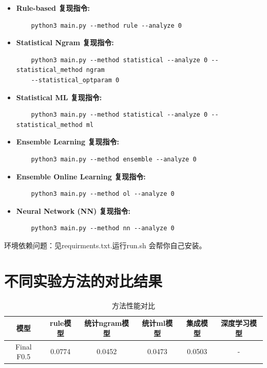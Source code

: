 \documentclass[answers]{exam}  %
\begin{document}
\begin{itemize}
    \item \textbf{Rule-based 复现指令:}
    \begin{lstlisting}
    python3 main.py --method rule --analyze 0  
    \end{lstlisting}

    \item \textbf{Statistical Ngram 复现指令:}
    \begin{lstlisting}
    python3 main.py --method statistical --analyze 0 --statistical_method ngram 
    --statistical_optparam 0
    \end{lstlisting}

    \item \textbf{Statistical ML 复现指令:}
    \begin{lstlisting}
    python3 main.py --method statistical --analyze 0 --statistical_method ml 
    \end{lstlisting}

    \item \textbf{Ensemble Learning 复现指令:}
    \begin{lstlisting}
    python3 main.py --method ensemble --analyze 0
    \end{lstlisting}

    \item \textbf{Ensemble Online Learning 复现指令:}
    \begin{lstlisting}
    python3 main.py --method ol --analyze 0
    \end{lstlisting}

    \item \textbf{Neural Network (NN) 复现指令:}
    \begin{lstlisting}
    python3 main.py --method nn --analyze 0 
    \end{lstlisting}
\end{itemize}

环境依赖问题：见requirments.txt.运行run.sh 会帮你自己安装。


\section{不同实验方法的对比结果}

\begin{table}[H]
    \centering
    \begin{tabular}{cccccc}
    \toprule
    \textbf{模型} & \textbf{rule模型} & \textbf{统计ngram模型} & \textbf{统计ml模型} & \textbf{集成模型} & \textbf{深度学习模型}\\
    \midrule
    Final F0.5 & 0.0774 & 0.0452 & 0.0473 & 0.0503 & - \\
    \bottomrule
    \end{tabular}
    \caption{方法性能对比}
    \end{table}
\end{document}
